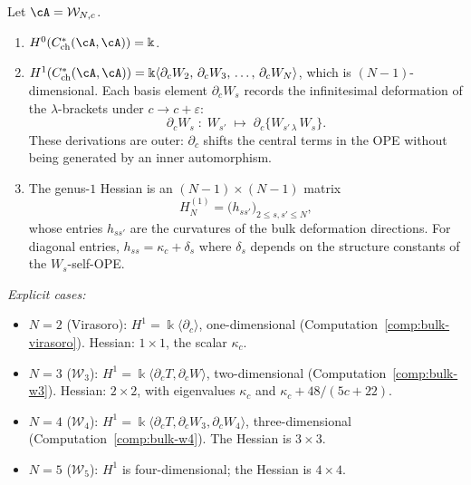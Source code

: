 \begin{computation}
\label{comp:bulk-wn}
%
%
Let $\cA = \mathcal{W}_{N,c}$.
\begin{enumerate}[label=\textup{(\roman*)}]
\item $H^0(C^*_{\mathrm{ch}}(\cA, \cA)) = \Bbbk$.
\item $H^1(C^*_{\mathrm{ch}}(\cA, \cA))
 = \Bbbk\langle \partial_c W_2,\, \partial_c W_3,\,
 \ldots,\, \partial_c W_N \rangle$,
 which is $(N-1)$-dimensional. Each basis element
 $\partial_c W_s$ records the infinitesimal deformation of
 the $\lambda$-brackets under $c \to c + \varepsilon$:
 \[
 \partial_c W_s \;:\;
 W_{s'} \;\longmapsto\;
 \partial_c\{W_{s'\,\lambda}\, W_s\}.
 \]
 These derivations are outer: $\partial_c$ shifts the central
 terms in the OPE without being generated by an inner
 automorphism.
\item The genus-$1$ Hessian is an $(N-1) \times (N-1)$ matrix
 \begin{equation}
 \label{eq:wn-hessian}
 H^{(1)}_N = \bigl(h_{ss'}\bigr)_{2 \le s, s' \le N},
 \end{equation}
 whose entries $h_{ss'}$ are the curvatures of the bulk
 deformation directions. For diagonal entries,
 $h_{ss} = \kappa_c + \delta_s$ where $\delta_s$ depends on
 the structure constants of the $W_s$-self-OPE.
\end{enumerate}

\emph{Explicit cases:}
\begin{itemize}
\item $N = 2$ \textup{(Virasoro):} $H^1 = \Bbbk\langle
 \partial_c\rangle$, one-dimensional
 \textup{(}Computation~\textup{\ref{comp:bulk-virasoro})}.
 Hessian: $1 \times 1$, the scalar $\kappa_c$.
\item $N = 3$ \textup{($\mathcal{W}_3$):} $H^1 = \Bbbk\langle
 \partial_c T, \partial_c W\rangle$, two-dimensional
 \textup{(}Computation~\textup{\ref{comp:bulk-w3})}.
 Hessian: $2 \times 2$, with eigenvalues
 $\kappa_c$ and $\kappa_c + 48/(5c+22)$.
\item $N = 4$ \textup{($\mathcal{W}_4$):} $H^1 = \Bbbk\langle
 \partial_c T, \partial_c W_3, \partial_c W_4\rangle$,
 three-dimensional
 \textup{(}Computation~\textup{\ref{comp:bulk-w4})}.
 The Hessian is $3 \times 3$.
\item $N = 5$ \textup{($\mathcal{W}_5$):}
 $H^1$ is four-dimensional; the Hessian is $4 \times 4$.
\end{itemize}
\end{computation}

